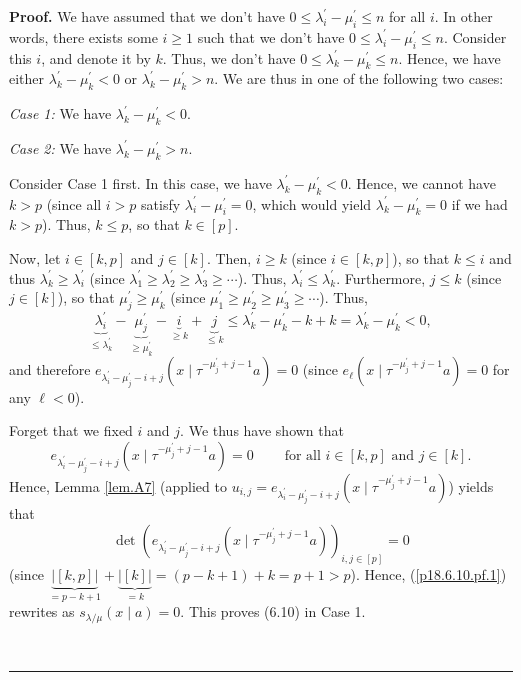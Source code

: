 \documentclass[numbers=enddot,12pt,final,onecolumn,notitlepage]{scrartcl}%
\theoremstyle{definition}
\newenvironment{proof}[1][Proof]{\noindent\textbf{#1.} }{\ \rule{0.5em}{0.5em}}
\begin{document}
\begin{enumerate}
\begin{proof}
We have assumed that we don't have $0\leq\lambda_{i}^{\prime}-\mu_{i}^{\prime
}\leq n$ for all $i$. In other words, there exists some $i\geq1$ such that we
don't have $0\leq\lambda_{i}^{\prime}-\mu_{i}^{\prime}\leq n$. Consider this
$i$, and denote it by $k$. Thus, we don't have $0\leq\lambda_{k}^{\prime}%
-\mu_{k}^{\prime}\leq n$. Hence, we have either $\lambda_{k}^{\prime}-\mu
_{k}^{\prime}<0$ or $\lambda_{k}^{\prime}-\mu_{k}^{\prime}>n$. We are thus in
one of the following two cases:

\textit{Case 1:} We have $\lambda_{k}^{\prime}-\mu_{k}^{\prime}<0$.

\textit{Case 2:} We have $\lambda_{k}^{\prime}-\mu_{k}^{\prime}>n$.

Consider Case 1 first. In this case, we have $\lambda_{k}^{\prime}-\mu
_{k}^{\prime}<0$. Hence, we cannot have $k>p$ (since all $i>p$ satisfy
$\lambda_{i}^{\prime}-\mu_{i}^{\prime}=0$, which would yield $\lambda
_{k}^{\prime}-\mu_{k}^{\prime}=0$ if we had $k>p$). Thus, $k\leq p$, so that
$k\in\left[  p\right]  $.

Now, let $i\in\left[  k,p\right]  $ and $j\in\left[  k\right]  $. Then, $i\geq
k$ (since $i\in\left[  k,p\right]  $), so that $k\leq i$ and thus $\lambda
_{k}^{\prime}\geq\lambda_{i}^{\prime}$ (since $\lambda_{1}^{\prime}\geq
\lambda_{2}^{\prime}\geq\lambda_{3}^{\prime}\geq\cdots$). Thus, $\lambda
_{i}^{\prime}\leq\lambda_{k}^{\prime}$. Furthermore, $j\leq k$ (since
$j\in\left[  k\right]  $), so that $\mu_{j}^{\prime}\geq\mu_{k}^{\prime}$
(since $\mu_{1}^{\prime}\geq\mu_{2}^{\prime}\geq\mu_{3}^{\prime}\geq\cdots$).
Thus,%
\[
\underbrace{\lambda_{i}^{\prime}}_{\leq\lambda_{k}^{\prime}}-\underbrace{\mu
_{j}^{\prime}}_{\geq\mu_{k}^{\prime}}-\underbrace{i}_{\geq k}+\underbrace{j}%
_{\leq k}\leq\lambda_{k}^{\prime}-\mu_{k}^{\prime}-k+k=\lambda_{k}^{\prime
}-\mu_{k}^{\prime}<0,
\]
and therefore $e_{\lambda_{i}^{\prime}-\mu_{j}^{\prime}-i+j}\left(  x\mid
\tau^{-\mu_{j}^{\prime}+j-1}a\right)  =0$ (since $e_{\ell}\left(  x\mid
\tau^{-\mu_{j}^{\prime}+j-1}a\right)  =0$ for any $\ell<0$).

Forget that we fixed $i$ and $j$. We thus have shown that
\[
e_{\lambda_{i}^{\prime}-\mu_{j}^{\prime}-i+j}\left(  x\mid\tau^{-\mu
_{j}^{\prime}+j-1}a\right)  =0\ \ \ \ \ \ \ \ \ \ \text{for all }i\in\left[
k,p\right]  \text{ and }j\in\left[  k\right]  .
\]
Hence, Lemma \ref{lem.A7} (applied to $u_{i,j}=e_{\lambda_{i}^{\prime}-\mu
_{j}^{\prime}-i+j}\left(  x\mid\tau^{-\mu_{j}^{\prime}+j-1}a\right)  $) yields
that%
\[
\det\left(  e_{\lambda_{i}^{\prime}-\mu_{j}^{\prime}-i+j}\left(  x\mid
\tau^{-\mu_{j}^{\prime}+j-1}a\right)  \right)  _{i,j\in\left[  p\right]  }=0
\]
(since $\underbrace{\left\vert \left[  k,p\right]  \right\vert }%
_{=p-k+1}+\underbrace{\left\vert \left[  k\right]  \right\vert }_{=k}=\left(
p-k+1\right)  +k=p+1>p$). Hence, (\ref{p18.6.10.pf.1}) rewrites as
$s_{\lambda/\mu}\left(  x\mid a\right)  =0$. This proves (6.10) in Case 1.


\end{proof}
\end{enumerate}
\end{document}
